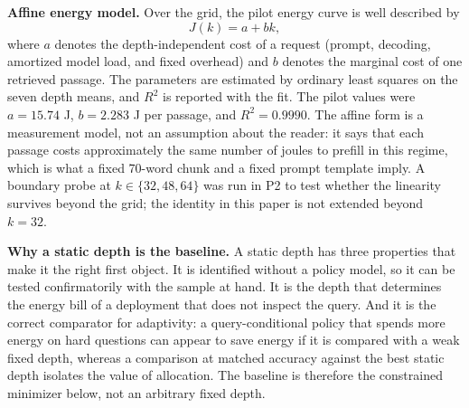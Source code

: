 \documentclass[a4paper,fleqn]{cas-sc}
\begin{document}
\textbf{Affine energy model.} Over the grid, the pilot energy curve is well described by
\begin{equation}\label{eq:affine}
  J(k)=a+bk,
\end{equation}
where $a$ denotes the depth-independent cost of a request (prompt, decoding, amortized model load, and fixed overhead) and $b$ denotes the marginal cost of one retrieved passage. The parameters are estimated by ordinary least squares on the seven depth means, and $R^{2}$ is reported with the fit. The pilot values were $a=15.74$ J, $b=2.283$ J per passage, and $R^{2}=0.9990$. The affine form is a measurement model, not an assumption about the reader: it says that each passage costs approximately the same number of joules to prefill in this regime, which is what a fixed 70-word chunk and a fixed prompt template imply. A boundary probe at $k\in\{32,48,64\}$ was run in P2 to test whether the linearity survives beyond the grid; the identity in this paper is not extended beyond $k=32$.

\textbf{Why a static depth is the baseline.} A static depth has three properties that make it the right first object. It is identified without a policy model, so it can be tested confirmatorily with the sample at hand. It is the depth that determines the energy bill of a deployment that does not inspect the query. And it is the correct comparator for adaptivity: a query-conditional policy that spends more energy on hard questions can appear to save energy if it is compared with a weak fixed depth, whereas a comparison at matched accuracy against the best static depth isolates the value of allocation. The baseline is therefore the constrained minimizer below, not an arbitrary fixed depth.
\end{document}
